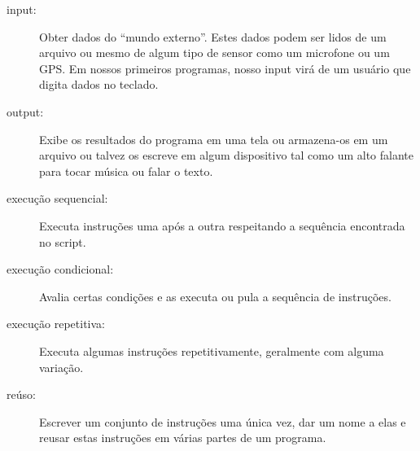 \begin{description}
%

\item[input:] Obter dados do ``mundo externo''. Estes dados podem ser lidos
de um arquivo ou mesmo de algum tipo de sensor como um microfone ou um GPS.
Em nossos primeiros programas, nosso input virá de um usuário que digita
dados no teclado.
%

\item[output:] Exibe os resultados do programa em uma tela ou armazena-os
em um arquivo ou talvez os escreve em algum dispositivo tal como um
alto falante para tocar música ou falar o texto.
%

\item[execução sequencial:] Executa instruções uma após a outra
respeitando a sequência encontrada no script.
%

\item[execução condicional:] Avalia certas condições e as executa
ou pula a sequência de instruções.
%

\item[execução repetitiva:] Executa algumas instruções repetitivamente,
geralmente com alguma variação.
%

\item[reúso:] Escrever um conjunto de instruções uma única vez, dar um 
nome a elas e reusar estas instruções em várias partes de um programa.
%

\end{description}
%

